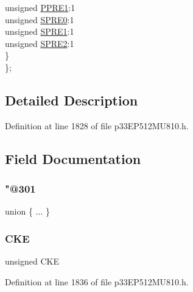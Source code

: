 \begin{DoxyCompactItemize}
\begin{tabbing}
\>\>unsigned \hyperlink{structtag_s_p_i1_c_o_n1_b_i_t_s_aa3b2b2be41d5f1c2cbb3d719899ec64b}{PPRE1}:1\\
\>\>unsigned \hyperlink{structtag_s_p_i1_c_o_n1_b_i_t_s_a36cb065bf6e87533eeb108f0f5383f6c}{SPRE0}:1\\
\>\>unsigned \hyperlink{structtag_s_p_i1_c_o_n1_b_i_t_s_aa10bf0541cfc6de804735f5e3beca089}{SPRE1}:1\\
\>\>unsigned \hyperlink{structtag_s_p_i1_c_o_n1_b_i_t_s_ad98c0587f19b608e8e40e67d2327634c}{SPRE2}:1\\
\>\} \\
\}; \\

\end{tabbing}\end{DoxyCompactItemize}


\subsection{Detailed Description}


Definition at line 1828 of file p33\+E\+P512\+M\+U810.\+h.



\subsection{Field Documentation}
\mbox{\label{structtag_s_p_i1_c_o_n1_b_i_t_s_af1a7e3e9bad25bd9fa57050faa7e0de9}} 
\subsubsection{\texorpdfstring{"@301}{@301}}
{\footnotesize\ttfamily union \{ ... \} }

\mbox{\label{structtag_s_p_i1_c_o_n1_b_i_t_s_ad6e30ba11b5574f8a5f548a818b64186}} 
\subsubsection{\texorpdfstring{C\+KE}{CKE}}
{\footnotesize\ttfamily unsigned C\+KE}



Definition at line 1836 of file p33\+E\+P512\+M\+U810.\+h.

